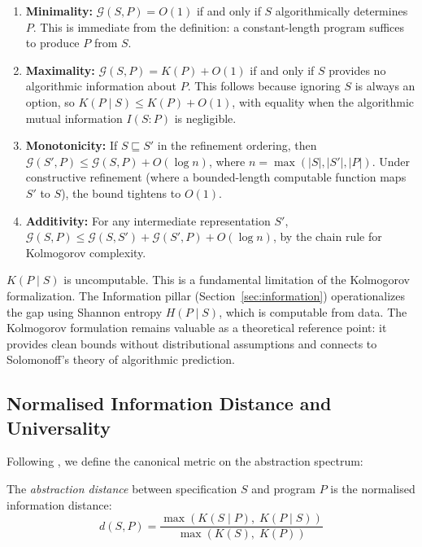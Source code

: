 \begin{enumerate}[label=(\alph*)]
    \item \textbf{Minimality:} $\mathcal{G}(S, P) = O(1)$ if and only if $S$ algorithmically determines $P$. This is immediate from the definition: a constant-length program suffices to produce $P$ from $S$.
    \item \textbf{Maximality:} $\mathcal{G}(S, P) = K(P) + O(1)$ if and only if $S$ provides no algorithmic information about $P$. This follows because ignoring $S$ is always an option, so $K(P \mid S) \leq K(P) + O(1)$, with equality when the algorithmic mutual information $I(S : P)$ is negligible.
    \item \textbf{Monotonicity:} If $S \sqsubseteq S'$ in the refinement ordering, then $\mathcal{G}(S', P) \leq \mathcal{G}(S, P) + O(\log n)$, where $n = \max(|S|, |S'|, |P|)$. Under constructive refinement (where a bounded-length computable function maps $S'$ to $S$), the bound tightens to $O(1)$.
    \item \textbf{Additivity:} For any intermediate representation $S'$, $\mathcal{G}(S, P) \leq \mathcal{G}(S, S') + \mathcal{G}(S', P) + O(\log n)$, by the chain rule for Kolmogorov complexity.
\end{enumerate}

\begin{remark}
$K(P \mid S)$ is uncomputable. This is a fundamental limitation of the Kolmogorov formalization. The Information pillar (Section~\ref{sec:information}) operationalizes the gap using Shannon entropy $H(P \mid S)$, which is computable from data. The Kolmogorov formulation remains valuable as a theoretical reference point: it provides clean bounds without distributional assumptions and connects to Solomonoff's theory of algorithmic prediction.
\end{remark}

\subsection{Normalised Information Distance and Universality}

Following \citet{li2004similarity}, we define the canonical metric on the abstraction spectrum:

\begin{definition}
The \emph{abstraction distance} between specification $S$ and program $P$ is the normalised information distance:
\begin{equation}
    d(S, P) = \frac{\max(K(S \mid P),\; K(P \mid S))}{\max(K(S),\; K(P))}
\end{equation}
\end{definition}

